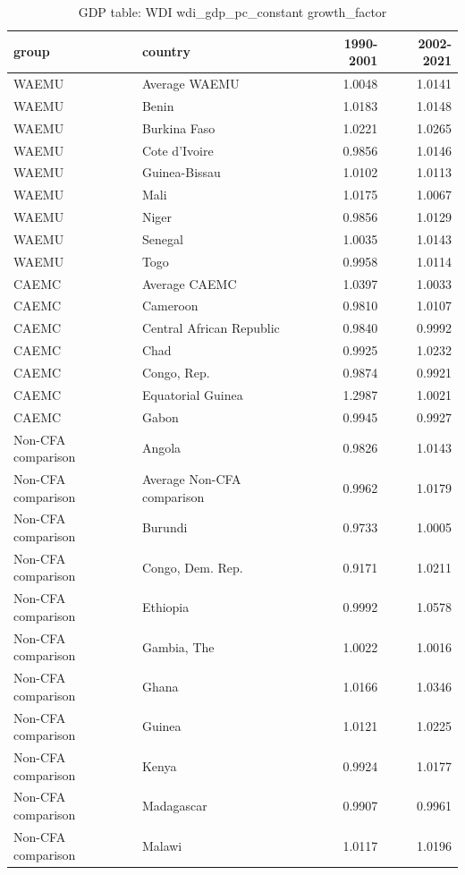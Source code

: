 \begin{table}

\caption{GDP table: WDI wdi_gdp_pc_constant growth_factor}
\centering
\begin{tabular}[t]{llrr}
\toprule
group & country & 1990-2001 & 2002-2021\\
\midrule
WAEMU & Average WAEMU & 1.0048 & 1.0141\\
WAEMU & Benin & 1.0183 & 1.0148\\
WAEMU & Burkina Faso & 1.0221 & 1.0265\\
WAEMU & Cote d'Ivoire & 0.9856 & 1.0146\\
WAEMU & Guinea-Bissau & 1.0102 & 1.0113\\
\addlinespace
WAEMU & Mali & 1.0175 & 1.0067\\
WAEMU & Niger & 0.9856 & 1.0129\\
WAEMU & Senegal & 1.0035 & 1.0143\\
WAEMU & Togo & 0.9958 & 1.0114\\
CAEMC & Average CAEMC & 1.0397 & 1.0033\\
\addlinespace
CAEMC & Cameroon & 0.9810 & 1.0107\\
CAEMC & Central African Republic & 0.9840 & 0.9992\\
CAEMC & Chad & 0.9925 & 1.0232\\
CAEMC & Congo, Rep. & 0.9874 & 0.9921\\
CAEMC & Equatorial Guinea & 1.2987 & 1.0021\\
\addlinespace
CAEMC & Gabon & 0.9945 & 0.9927\\
Non-CFA comparison & Angola & 0.9826 & 1.0143\\
Non-CFA comparison & Average Non-CFA comparison & 0.9962 & 1.0179\\
Non-CFA comparison & Burundi & 0.9733 & 1.0005\\
Non-CFA comparison & Congo, Dem. Rep. & 0.9171 & 1.0211\\
\addlinespace
Non-CFA comparison & Ethiopia & 0.9992 & 1.0578\\
Non-CFA comparison & Gambia, The & 1.0022 & 1.0016\\
Non-CFA comparison & Ghana & 1.0166 & 1.0346\\
Non-CFA comparison & Guinea & 1.0121 & 1.0225\\
Non-CFA comparison & Kenya & 0.9924 & 1.0177\\
\addlinespace
Non-CFA comparison & Madagascar & 0.9907 & 0.9961\\
Non-CFA comparison & Malawi & 1.0117 & 1.0196\\

\end{tabular}
\end{table}
